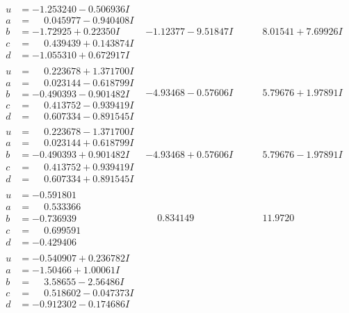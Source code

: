 \documentclass[1p]{elsarticle_modified}
\theoremstyle{definition}
\begin{document}
$$\begin{array}{c|c|c}
\begin{aligned}
u &= -1.253240 - 0.506936 I \\
a &= \phantom{-}0.045977 - 0.940408 I \\
b &= -1.72925 + 0.22350 I \\
c &= \phantom{-}0.439439 + 0.143874 I \\
d &= -1.055310 + 0.672917 I\end{aligned}
 & -1.12377 - 9.51847 I & \phantom{-}8.01541 + 7.69926 I \\ \hline\begin{aligned}
u &= \phantom{-}0.223678 + 1.371700 I \\
a &= \phantom{-}0.023144 - 0.618799 I \\
b &= -0.490393 - 0.901482 I \\
c &= \phantom{-}0.413752 - 0.939419 I \\
d &= \phantom{-}0.607334 - 0.891545 I\end{aligned}
 & -4.93468 - 0.57606 I & \phantom{-}5.79676 + 1.97891 I \\ \hline\begin{aligned}
u &= \phantom{-}0.223678 - 1.371700 I \\
a &= \phantom{-}0.023144 + 0.618799 I \\
b &= -0.490393 + 0.901482 I \\
c &= \phantom{-}0.413752 + 0.939419 I \\
d &= \phantom{-}0.607334 + 0.891545 I\end{aligned}
 & -4.93468 + 0.57606 I & \phantom{-}5.79676 - 1.97891 I \\ \hline\begin{aligned}
u &= -0.591801\phantom{ +0.000000I} \\
a &= \phantom{-}0.533366\phantom{ +0.000000I} \\
b &= -0.736939\phantom{ +0.000000I} \\
c &= \phantom{-}0.699591\phantom{ +0.000000I} \\
d &= -0.429406\phantom{ +0.000000I}\end{aligned}
 & \phantom{-}0.834149\phantom{ +0.000000I} & \phantom{-}11.9720\phantom{ +0.000000I} \\ \hline\begin{aligned}
u &= -0.540907 + 0.236782 I \\
a &= -1.50466 + 1.00061 I \\
b &= \phantom{-}3.58655 - 2.56486 I \\
c &= \phantom{-}0.518602 - 0.047373 I \\
d &= -0.912302 - 0.174686 I\end{aligned}

\end{array}$$
\end{document}
